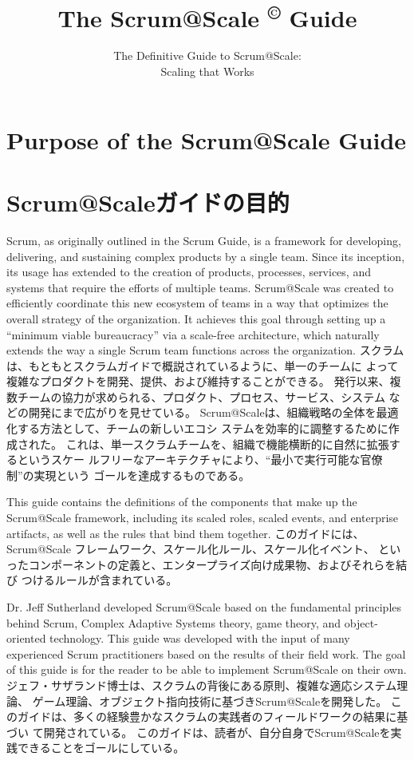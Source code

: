 \documentclass[12pt,a4paper,parskip=full]{scrartcl}
\title{\Huge{\color{red}\textbf{The Scrum@Scale
\textsuperscript{\copyright}
Guide}}}
\subtitle{\color{gray}The Definitive Guide to Scrum@Scale:\\ Scaling that
Works}
\date{}
\begin{document}

\section{Purpose of the Scrum@Scale Guide}
\fi
\section{Scrum@Scaleガイドの目的}
Scrum, as originally outlined in the Scrum Guide, is a framework for
developing, delivering, and sustaining complex products by a single team.
Since its inception, its usage has extended to the creation of products,
processes, services, and systems that require the efforts of multiple
teams. Scrum@Scale was created to efficiently coordinate this new ecosystem
of teams in a way that optimizes the overall strategy of the organization.
It achieves this goal through setting up a ``minimum viable bureaucracy''
via a scale-free architecture, which naturally extends the way a single
Scrum team functions across the organization.
\fi
スクラムは、もともとスクラムガイドで概説されているように、単一のチームに
よって複雑なプロダクトを開発、提供、および維持することができる。
発行以来、複数チームの協力が求められる、プロダクト、プロセス、サービス、システム
などの開発にまで広がりを見せている。
Scrum@Scaleは、組織戦略の全体を最適化する方法として、チームの新しいエコシ
ステムを効率的に調整するために作成された。
これは、単一スクラムチームを、組織で機能横断的に自然に拡張するというスケー
ルフリーなアーキテクチャにより、``最小で実行可能な官僚制''の実現という
ゴールを達成するものである。

This guide contains the definitions of the components that make up the
Scrum@Scale framework, including its scaled roles, scaled events, and
enterprise artifacts, as well as the rules that bind them together.
\fi
このガイドには、Scrum@Scale フレームワーク、スケール化ルール、スケール化イベント、
といったコンポーネントの定義と、エンタープライズ向け成果物、およびそれらを結び
つけるルールが含まれている。

Dr. Jeff Sutherland developed Scrum@Scale based on the fundamental
principles behind Scrum, Complex Adaptive Systems theory, game theory, and
object-oriented technology. This guide was developed with the input of many
experienced Scrum practitioners based on the results of their field work.
The goal of this guide is for the reader to be able to implement Scrum@Scale
on their own.
\fi
ジェフ・サザランド博士は、スクラムの背後にある原則、複雑な適応システム理論、
ゲーム理論、オブジェクト指向技術に基づきScrum@Scaleを開発した。
このガイドは、多くの経験豊かなスクラムの実践者のフィールドワークの結果に基づい
て開発されている。
このガイドは、読者が、自分自身でScrum@Scaleを実践できることをゴールにしている。
\end{document}

